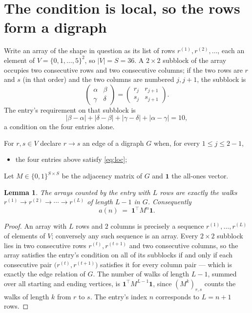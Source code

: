 \documentclass[11pt,a4paper]{article}
\theoremstyle{plain}
\newtheorem{lemma}[theorem]{Lemma}
\theoremstyle{definition}
\begin{document}
\section{The condition is local, so the rows form a digraph}

Write an array of the shape in question as its list of rows
$r^{(1)},r^{(2)},\dots$, each an element of
$V=\{0,1,\dots,5\}^{2}$, so $|V|=S=36$. A $2\times2$ subblock of the array
occupies two consecutive rows and two consecutive columns; if the two rows are $r$
and $s$ (in that order) and the two columns are numbered $j,j+1$,
the subblock is
\[
\begin{pmatrix}\alpha&\beta\\\gamma&\delta\end{pmatrix}=\begin{pmatrix}r_j&r_{j+1}\\s_j&s_{j+1}\end{pmatrix}.
\]
The entry's requirement on that subblock is
\begin{equation}\label{eq:loc}
|\beta-\alpha|+|\delta-\beta|+|\gamma-\delta|+|\alpha-\gamma|=10,
\end{equation}
a condition on the four entries alone.

For $r,s\in V$ declare $r\to s$ an edge of a digraph $G$ when, for every
$1\le j\le 2-1$,
\begin{itemize}
\item the four entries above satisfy \eqref{eq:loc};

\end{itemize}
Let $M\in\{0,1\}^{S\times S}$ be the adjacency matrix of $G$ and $\mathbf{1}$ the
all-ones vector.

\begin{lemma}\label{lem:walk}
The arrays counted by the entry with $L$ rows are exactly the walks
$r^{(1)}\to r^{(2)}\to\cdots\to r^{(L)}$ of length $L-1$ in $G$. Consequently
\[
a(n)\;=\;\mathbf{1}^{\!\top}M^{n}\mathbf{1} .
\]
\end{lemma}

\begin{proof}
An array with $L$ rows and $2$ columns is precisely a sequence
$r^{(1)},\dots,r^{(L)}$ of elements of $V$; conversely any such sequence is an array.
Every $2\times2$ subblock lies in two consecutive rows $r^{(t)},r^{(t+1)}$ and two
consecutive columns, so the array satisfies the entry's condition on all of its subblocks
if and only if each consecutive pair $\bigl(r^{(t)},r^{(t+1)}\bigr)$ satisfies it for
every column pair --- which is exactly the edge relation of $G$. The number of walks of
length $L-1$, summed over all starting and ending vertices, is
$\mathbf{1}^{\!\top}M^{L-1}\mathbf{1}$, since $(M^{k})_{r,s}$ counts the walks of
length $k$ from $r$ to $s$. The entry's index $n$ corresponds to $L=n+1$ rows.
\end{proof}
\end{document}
